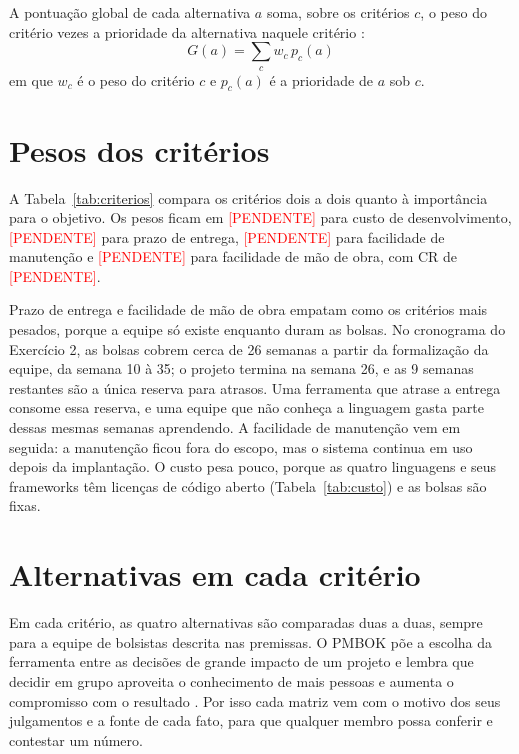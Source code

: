 \documentclass[a4paper]{article}
\newcommand{\pendente}{\textcolor{red}{[PENDENTE]}}
\newcommand{\crCriterios}{\pendente}
\newcommand{\pesoCusto}{\pendente}
\newcommand{\pesoPrazo}{\pendente}
\newcommand{\pesoManutencao}{\pendente}
\newcommand{\pesoMaoDeObra}{\pendente}
\newcommand{\tabelagerada}[1]{\IfFileExists{tabelas/#1.tex}{}{\textcolor{red}{[PENDENTE: rodar ahp.py]}}}
\begin{document}
A pontuação global de cada alternativa $a$ soma, sobre os critérios $c$, o peso do critério vezes a prioridade da alternativa naquele critério \cite{vargas2010}:
\[
    G(a) = \sum_{c} w_c \, p_c(a)
\]
em que $w_c$ é o peso do critério $c$ e $p_c(a)$ é a prioridade de $a$ sob $c$.

\section{Pesos dos critérios}

A Tabela~\ref{tab:criterios} compara os critérios dois a dois quanto à importância para o objetivo. Os pesos ficam em \pesoCusto{} para custo de desenvolvimento, \pesoPrazo{} para prazo de entrega, \pesoManutencao{} para facilidade de manutenção e \pesoMaoDeObra{} para facilidade de mão de obra, com CR de \crCriterios.

Prazo de entrega e facilidade de mão de obra empatam como os critérios mais pesados, porque a equipe só existe enquanto duram as bolsas. No cronograma do Exercício 2, as bolsas cobrem cerca de 26 semanas a partir da formalização da equipe, da semana 10 à 35; o projeto termina na semana 26, e as 9 semanas restantes são a única reserva para atrasos. Uma ferramenta que atrase a entrega consome essa reserva, e uma equipe que não conheça a linguagem gasta parte dessas mesmas semanas aprendendo. A facilidade de manutenção vem em seguida: a manutenção ficou fora do escopo, mas o sistema continua em uso depois da implantação. O custo pesa pouco, porque as quatro linguagens e seus frameworks têm licenças de código aberto (Tabela~\ref{tab:custo}) e as bolsas são fixas.

\begin{table}[H]
    \centering
    \small
    \renewcommand{\arraystretch}{1.25}
    \tabelagerada{matriz_criterios}
    \caption{Matriz de comparação dos critérios e vetor de pesos (CR~=~\crCriterios).}
    \label{tab:criterios}
\end{table}

\section{Alternativas em cada critério}

Em cada critério, as quatro alternativas são comparadas duas a duas, sempre para a equipe de bolsistas descrita nas premissas. O PMBOK põe a escolha da ferramenta entre as decisões de grande impacto de um projeto e lembra que decidir em grupo aproveita o conhecimento de mais pessoas e aumenta o compromisso com o resultado \cite[p.~27--28]{pmi2021}. Por isso cada matriz vem com o motivo dos seus julgamentos e a fonte de cada fato, para que qualquer membro possa conferir e contestar um número.
\end{document}
